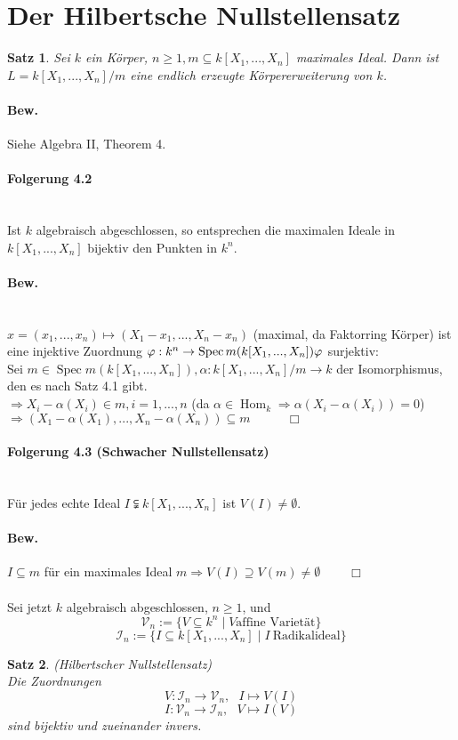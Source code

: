 \documentclass[a4paper,12pt]{report}
\theoremstyle{break}
\newtheorem{Satz}{Satz}
\theoremstyle{nonumberbreak}
\theoremstyle{nonumberplain}
\begin{document}
\section{Der Hilbertsche Nullstellensatz}
\begin{Satz}
Sei  $k$ ein Körper, $n\geq 1, m\subseteq k[X_1,...,X_n]$ maximales Ideal. Dann ist $L=k[X_1,...,X_n]/m$ eine endlich erzeugte Körpererweiterung von $k$.
\end{Satz}
\paragraph{Bew.} Siehe Algebra II, Theorem 4.
\paragraph{Folgerung 4.2}~\\
Ist $k$ algebraisch abgeschlossen, so entsprechen die maximalen Ideale in $k[X_1,...,X_n]$ bijektiv den Punkten in $k^n$.
\paragraph{Bew.}~\\
$x=(x_1,...,x_n)\mapsto (X_1-x_1,...,X_n-x_n)$ (maximal, da Faktorring Körper) ist eine injektive Zuordnung $\varphi: k^n \rightarrow\operatorname{Spec}m(k[X_1,...,X_n])\\
\varphi$ surjektiv:\\
Sei $m\in\operatorname{Spec} m (k[X_1,...,X_n]), \alpha: k[X_1,...,X_n]/m \rightarrow k$ der Isomorphismus, den es nach Satz 4.1 gibt.\\
$\Rightarrow X_i - \alpha(X_i)\in m, i= 1,...,n$ (da $\alpha\in \operatorname{Hom}_k\Rightarrow \alpha(X_i-\alpha(X_i))=0$)\\
$\Rightarrow (X_1-\alpha(X_1),...,X_n-\alpha(X_n)) \subseteq m ~~~~~~~~~~~~~\Box$
\paragraph{Folgerung 4.3 (Schwacher Nullstellensatz)}~\\
Für jedes echte Ideal $I\subsetneqq k[X_1,...,X_n]$ ist $V(I)\neq \emptyset$.
\paragraph{Bew.}
$I\subseteq m$ für ein maximales Ideal $m \Rightarrow V(I) \supseteq V(m) \neq \emptyset ~~~~~~~~~~\Box$\\\\
Sei jetzt  $k$ algebraisch abgeschlossen, $n\geq 1$, und
$$\mathcal{V}_n:= \{V\subseteq k^n\mid V \textrm{affine~Varietät}\}$$
$$\mathcal{I}_n:=\{I\subseteq k[X_1,...,X_n]\mid I ~ \textrm{Radikalideal}\}$$
\begin{Satz} (Hilbertscher Nullstellensatz)\\
Die Zuordnungen
$$V: \mathcal{I}_n \rightarrow \mathcal{V}_n,~~~I\mapsto V(I)$$
$$I: \mathcal{V}_n \rightarrow \mathcal{I}_n,~~~V\mapsto I(V)$$
sind bijektiv und zueinander invers.
\end{Satz}
\end{document}
